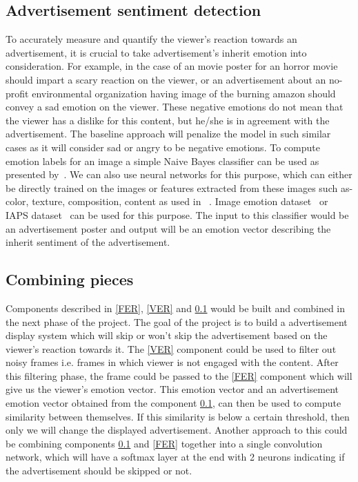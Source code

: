 \documentclass[10pt,twocolumn,letterpaper]{article}
\begin{document}
\subsection{Advertisement sentiment detection} \label{AER}

To accurately measure and quantify the viewer's reaction towards an advertisement, it is crucial to take advertisement's inherit emotion into consideration. For example, in the case of an movie poster for an horror movie should impart a scary reaction on the viewer, or an advertisement about an no-profit environmental organization having image of the burning amazon should convey a sad emotion on the viewer. These negative emotions do not mean that the viewer has a dislike for this content, but he/she is in agreement with the advertisement. The baseline approach will penalize the model in such similar cases as it will consider sad or angry to be negative emotions. To compute emotion labels for an image a simple Naive Bayes classifier can be used as presented by~\cite{ImageEmoClassification}. We can also use neural networks for this purpose, which can either be directly trained on the images or features extracted from these images such as- color, texture, composition, content as used in ~\cite{ImageEmoClassification}. Image emotion dataset~\cite{ImageEmoDataset} or IAPS dataset~\cite{IAPS} can be used for this purpose. The input to this classifier would be an advertisement poster and output will be an emotion vector describing the inherit sentiment of the advertisement.


\subsection{Combining pieces}

Components described in \ref{FER}, \ref{VER} and \ref{AER} would be built and combined in the next phase of the project. The goal of the project is to build a advertisement display system which will skip or won't skip the advertisement based on the viewer's reaction towards it. The \ref{VER} component could be used to filter out noisy frames i.e. frames in which viewer is not engaged with the content. After this filtering phase, the frame could be passed to the \ref{FER} component which will give us the viewer's emotion vector. This emotion vector and an advertisement emotion vector obtained from the component \ref{AER}, can then be used to compute similarity between themselves. If this similarity is below a certain threshold, then only we will change the displayed advertisement. 
Another approach to this could be combining components \ref{AER} and \ref{FER} together into a single convolution network, which will have a softmax layer at the end with 2 neurons indicating if the advertisement should be skipped or not.

{\small


}
\end{document}
